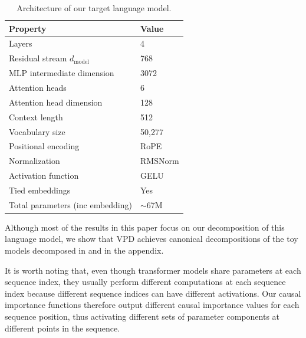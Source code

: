 \documentclass{article}
\begin{document}
\begin{table}[ht]
  \caption{Architecture of our target language model.}
  \label{model-hyperparams}
  \centering
  \begin{tabular}{ll}
    \toprule
    \textbf{Property} & \textbf{Value} \\
    \midrule
    Layers                                         & 4               \\
    Residual stream $d_{\text{model}}$              & 768             \\
    MLP intermediate dimension                      & 3072            \\
    Attention heads                                 & 6               \\
    Attention head dimension                        & 128             \\
    Context length                                  & 512             \\
    Vocabulary size                                 & 50{,}277        \\
    Positional encoding                             & RoPE            \\
    Normalization                                   & RMSNorm         \\
    Activation function                             & GELU            \\
    Tied embeddings                                 & Yes             \\
    Total parameters (inc embedding)                & ${\sim}$67M     \\
    \bottomrule
  \end{tabular}
\end{table}

Although most of the results in this paper focus on our decomposition of this language model, we show that VPD achieves canonical decompositions of the toy models decomposed in \cite{braun2025interpretabilityparameterspaceminimizing} and \cite{bushnaq2025spd} in the appendix. 

It is worth noting that, even though transformer models share parameters at each sequence index, they usually perform different computations at each sequence index because different sequence indices can have different activations. Our causal importance functions therefore output different causal importance values for each sequence position, thus activating different sets of parameter components at different points in the sequence. 
\end{document}
